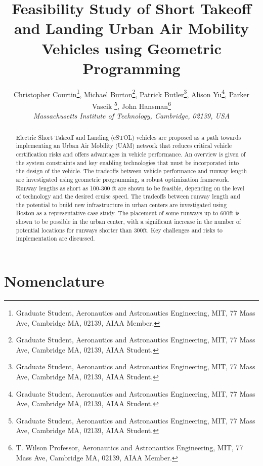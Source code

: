 \documentclass[]{aiaa-tc}%
\title{Feasibility Study of Short Takeoff and Landing Urban Air Mobility Vehicles using Geometric Programming}
\author{
  Christopher Courtin\thanks{Graduate Student, Aeronautics and Astronautics Engineering, MIT, 77 Mass Ave, Cambridge MA, 02139, AIAA Member.}, 
  Michael Burton\thanks{Graduate Student, Aeronautics and Astronautics Engineering, MIT, 77 Mass Ave, Cambridge MA, 02139, AIAA Student.}, 
  Patrick Butler\thanks{Graduate Student, Aeronautics and Astronautics Engineering, MIT, 77 Mass Ave, Cambridge MA, 02139, AIAA Student.}, 
  Alison Yu\thanks{Graduate Student, Aeronautics and Astronautics Engineering, MIT, 77 Mass Ave, Cambridge MA, 02139, AIAA Student.}, 
 Parker Vascik \thanks{Graduate Student, Aeronautics and Astronautics Engineering, MIT, 77 Mass Ave, Cambridge MA, 02139, AIAA Student.}, 
  John Hansman\thanks{T. Wilson Professor, Aeronautics and Astronautics Engineering, MIT, 77 Mass Ave, Cambridge MA, 02139, AIAA Member.} \\
  {\normalsize\itshape
   Massachusetts Institute of Technology, Cambridge, 02139, USA}\\
 }
\begin{document}
\graphicspath{{./figs/}}
\maketitle

\begin{abstract}
    Electric Short Takeoff and Landing (eSTOL) vehicles are proposed as a path towards implementing an Urban Air Mobility (UAM) network that reduces critical vehicle certification risks and offers advantages in vehicle performance.  An overview is given of the system constraints and key enabling technologies that must be incorporated into the design of the vehicle. The tradeoffs between vehicle performance and runway length are investigated using geometric programming, a robust optimization framework.  Runway lengths as short as 100-300 ft are shown to be feasible, depending on the level of technology and the desired cruise speed. The tradeoffs between runway length and the potential to build new infrastructure in urban centers are investigated using Boston as a representative case study.  The placement of some runways up to 600ft is shown to be possible in the urban center, with a significant increase in the number of potential locations for runways shorter than 300ft. Key challenges and risks to implementation are discussed.  


\end{abstract}

\section*{Nomenclature}
\end{document}
